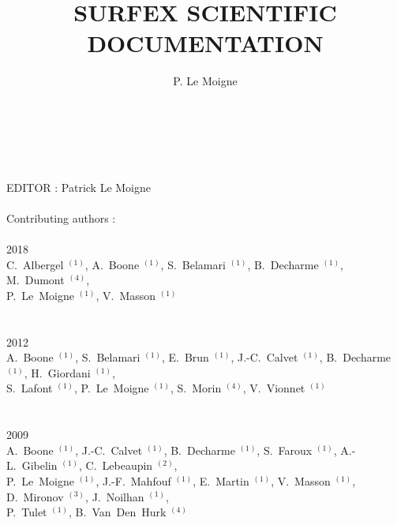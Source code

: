\documentclass[11pt]{book}
\begin{document}
\title{SURFEX SCIENTIFIC\\ DOCUMENTATION}
\author{P. Le Moigne}
\maketitle

{\large{~ \\ \\ \\ 
EDITOR :  Patrick Le Moigne \\ \\

Contributing authors :  \\ \\

2018\\
C.~Albergel       $^{(1)}$, 
A.~Boone          $^{(1)}$, 
S.~Belamari       $^{(1)}$, 
B.~Decharme       $^{(1)}$,  
M.~Dumont         $^{(4)}$, \\ 
P.~Le~Moigne      $^{(1)}$, 
V.~Masson         $^{(1)}$  \\ \\ \\

2012\\
A.~Boone          $^{(1)}$, 
S.~Belamari       $^{(1)}$, 
E.~Brun           $^{(1)}$, 
J.-C.~Calvet      $^{(1)}$, 
B.~Decharme       $^{(1)}$,  
H.~Giordani       $^{(1)}$,  \\
S.~Lafont         $^{(1)}$,  
P.~Le~Moigne      $^{(1)}$, 
S.~Morin          $^{(4)}$, 
V.~Vionnet        $^{(1)}$  \\ \\ \\

2009\\
A.~Boone          $^{(1)}$, 
J.-C.~Calvet      $^{(1)}$, 
B.~Decharme       $^{(1)}$, 
S.~Faroux         $^{(1)}$, 
A.-L.~Gibelin     $^{(1)}$, 
C.~Lebeaupin      $^{(2)}$,  \\
P.~Le~Moigne      $^{(1)}$, 
J.-F.~Mahfouf     $^{(1)}$, 
E.~Martin         $^{(1)}$, 
V.~Masson         $^{(1)}$, 
D.~Mironov        $^{(3)}$, 
J.~Noilhan        $^{(1)}$, \\
P.~Tulet          $^{(1)}$,
B.~Van~Den~Hurk   $^{(4)}$  \\ \\ \\ 


}}
\end{document}
